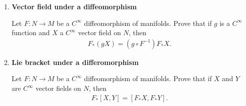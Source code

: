 \documentclass[12pt,a4paper]{report}
\begin{document}
\begin{enumerate}[label=14.\arabic*]
	\item \textbf{Vector field under a diffeomorphism}
	
	Let $F: N \to M$ be a $C^\infty$ diffeomorphism of manifolds.  Prove that if $g$ is a $C^\infty$ function and $X$ a $C^\infty$ vector field on $N$, then
	\begin{align*}
		F_*(gX) = (g\circ F^{-1})F_*X.
	\end{align*}
	
	\item \textbf{Lie bracket under a differomorphism}
	
	Let $F: N \to M$ be a $C^\infty$ diffeomorphism of manifolds.  Prove that if $X$ and $Y$ are $C^\infty$ vector fields  on $N$, then 
	\begin{align*}
		F_*[X,Y]=[F_*X, F_*Y].
	\end{align*}
\end{enumerate}
\end{document}
